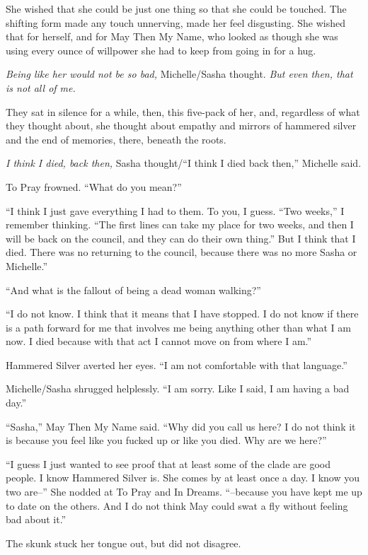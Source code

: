 She wished that she could be just one thing so that she could be touched. The shifting form made any touch unnerving, made her feel disgusting. She wished that for herself, and for May Then My Name, who looked as though she was using every ounce of willpower she had to keep from going in for a hug.

\emph{Being like her would not be so bad,} Michelle/Sasha thought. \emph{But even then, that is not all of me.}

They sat in silence for a while, then, this five-pack of her, and, regardless of what they thought about, she thought about empathy and mirrors of hammered silver and the end of memories, there, beneath the roots.

\emph{I think I died, back then,} Sasha thought/``I think I died back then,'' Michelle said.

To Pray frowned. ``What do you mean?''

``I think I just gave everything I had to them. To you, I guess. ``Two weeks,'' I remember thinking. ``The first lines can take my place for two weeks, and then I will be back on the council, and they can do their own thing.'' But I think that I died. There was no returning to the council, because there was no more Sasha or Michelle.''

``And what is the fallout of being a dead woman walking?''

``I do not know. I think that it means that I have stopped. I do not know if there is a path forward for me that involves me being anything other than what I am now. I died because with that act I cannot move on from where I am.''

Hammered Silver averted her eyes. ``I am not comfortable with that language.''

Michelle/Sasha shrugged helplessly. ``I am sorry. Like I said, I am having a bad day.''

``Sasha,'' May Then My Name said. ``Why did you call us here? I do not think it is because you feel like you fucked up or like you died. Why are we here?''

``I guess I just wanted to see proof that at least some of the clade are good people. I know Hammered Silver is. She comes by at least once a day. I know you two are--'' She nodded at To Pray and In Dreams. ``--because you have kept me up to date on the others. And I do not think May could swat a fly without feeling bad about it.''

The skunk stuck her tongue out, but did not disagree.


